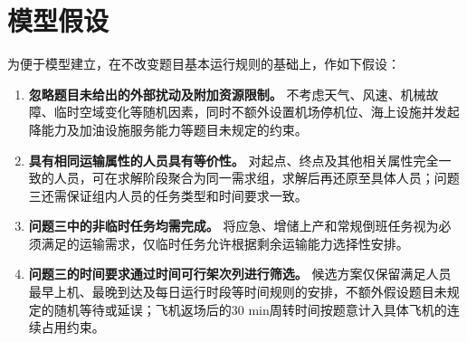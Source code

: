 \section{模型假设}\label{sec:assumptions}

为便于模型建立，在不改变题目基本运行规则的基础上，作如下假设：

\begin{enumerate}
    \item \textbf{忽略题目未给出的外部扰动及附加资源限制。}
    不考虑天气、风速、机械故障、临时空域变化等随机因素，同时不额外设置机场停机位、海上设施并发起降能力及加油设施服务能力等题目未规定的约束。

    \item \textbf{具有相同运输属性的人员具有等价性。}
    对起点、终点及其他相关属性完全一致的人员，可在求解阶段聚合为同一需求组，求解后再还原至具体人员；问题三还需保证组内人员的任务类型和时间要求一致。

    \item \textbf{问题三中的非临时任务均需完成。}
    将应急、增储上产和常规倒班任务视为必须满足的运输需求，仅临时任务允许根据剩余运输能力选择性安排。

    \item \textbf{问题三的时间要求通过时间可行架次列进行筛选。}
    候选方案仅保留满足人员最早上机、最晚到达及每日运行时段等时间规则的安排，不额外假设题目未规定的随机等待或延误；飞机返场后的30 min周转时间按题意计入具体飞机的连续占用约束。
\end{enumerate}
